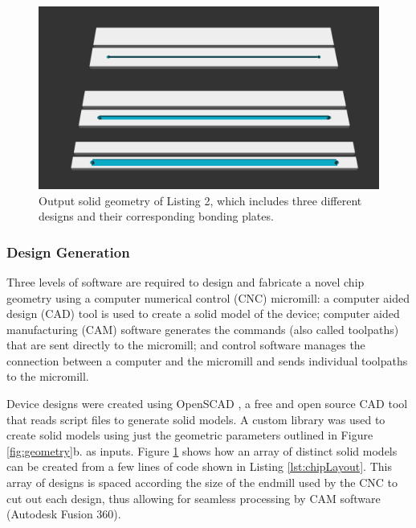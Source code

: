 \begin{figure}[htb]
  \begin{minipage}[t]{0.99\linewidth}\centering
    \includegraphics[width=14cm]{ExampleLayout}
  \end{minipage}\hfill
  \caption[Example layout of multiple device designs]{Output solid geometry of Listing 2, which includes three different designs and their corresponding bonding plates.}
	\label{fig:layout}
\end{figure}

\subsubsection{Design Generation}
\label{ssec:design}
Three levels of software are required to design and fabricate a novel chip geometry using a computer numerical control (CNC) micromill: a computer aided design (CAD) tool is used to create a solid model of the device; computer aided manufacturing (CAM) software generates the commands (also called toolpaths) that are sent directly to the micromill; and control software manages the connection between a computer and the micromill and sends individual toolpaths to the micromill. 

Device designs were created using OpenSCAD \cite{wikiOpenScad}, a free and open source CAD tool that reads script files to generate solid models. A custom library was used to create solid models using just the geometric parameters outlined in Figure \ref{fig:geometry}b. as inputs. Figure \ref{fig:layout} shows how an array of distinct solid models can be created from a few lines of code shown in Listing \ref{lst:chipLayout}. This array of designs is spaced according the size of the endmill used by the CNC to cut out each design, thus allowing for seamless processing by CAM software (Autodesk Fusion 360).

